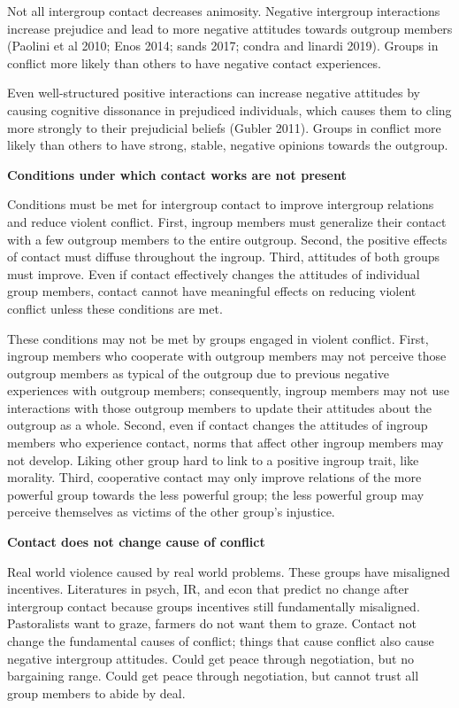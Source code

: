 \documentclass[11pt]{article}
\begin{document}
Not all intergroup contact decreases animosity. Negative intergroup
interactions increase prejudice and lead to more negative attitudes
towards outgroup members (Paolini et al 2010; Enos 2014; sands 2017;
condra and linardi 2019). Groups in conflict more likely than others to
have negative contact experiences.

Even well-structured positive interactions can increase negative
attitudes by causing cognitive dissonance in prejudiced individuals,
which causes them to cling more strongly to their prejudicial beliefs
(Gubler 2011). Groups in conflict more likely than others to have
strong, stable, negative opinions towards the outgroup.

\textbf{Conditions under which contact works are not present}

Conditions must be met for intergroup contact to improve intergroup
relations and reduce violent conflict. First, ingroup members must
generalize their contact with a few outgroup members to the entire
outgroup. Second, the positive effects of contact must diffuse
throughout the ingroup. Third, attitudes of both groups must improve.
Even if contact effectively changes the attitudes of individual group
members, contact cannot have meaningful effects on reducing violent
conflict unless these conditions are met.

These conditions may not be met by groups engaged in violent conflict.
First, ingroup members who cooperate with outgroup members may not
perceive those outgroup members as typical of the outgroup due to
previous negative experiences with outgroup members; consequently,
ingroup members may not use interactions with those outgroup members to
update their attitudes about the outgroup as a whole. Second, even if
contact changes the attitudes of ingroup members who experience contact,
norms that affect other ingroup members may not develop. Liking other
group hard to link to a positive ingroup trait, like morality. Third,
cooperative contact may only improve relations of the more powerful
group towards the less powerful group; the less powerful group may
perceive themselves as victims of the other group's injustice.

\textbf{Contact does not change cause of conflict}

Real world violence caused by real world problems. These groups have
misaligned incentives. Literatures in psych, IR, and econ that predict
no change after intergroup contact because groups incentives still
fundamentally misaligned. Pastoralists want to graze, farmers do not
want them to graze. Contact not change the fundamental causes of
conflict; things that cause conflict also cause negative intergroup
attitudes. Could get peace through negotiation, but no bargaining range.
Could get peace through negotiation, but cannot trust all group members
to abide by deal.
\end{document}
